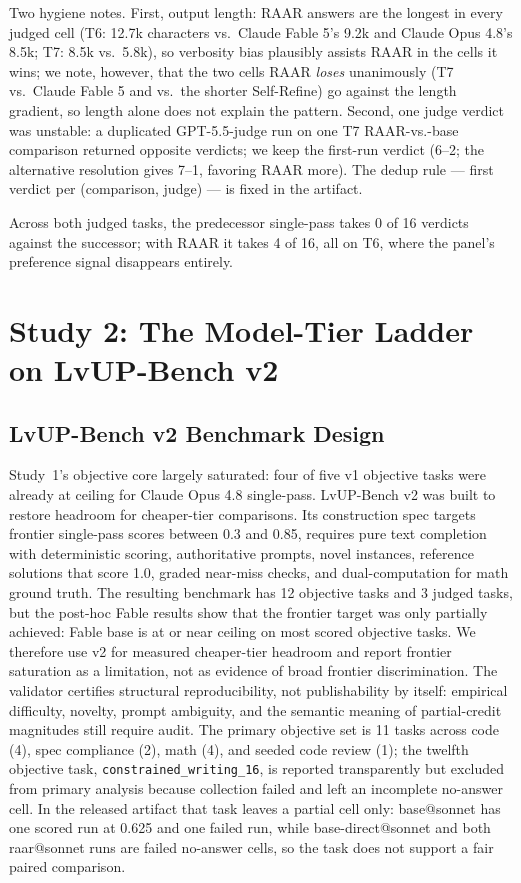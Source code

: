 \documentclass[journal]{IEEEtran}
\newcommand{\method}{RAAR}
\newcommand{\bench}{LvUP-Bench}
\newcommand{\opus}{Claude Opus 4.8}
\newcommand{\fable}{Claude Fable 5}
\begin{document}
Two hygiene notes. First, output length: \method{} answers are the longest
in every judged cell (T6: 12.7k characters vs.\ \fable{}'s 9.2k and
\opus{}'s 8.5k; T7: 8.5k vs.\ 5.8k), so verbosity bias \cite{zheng2023}
plausibly assists \method{} in the cells it wins; we note, however, that
the two cells \method{} \emph{loses} unanimously (T7 vs.\ \fable{} and
vs.\ the shorter Self-Refine) go against the length gradient, so length
alone does not explain the pattern. Second, one judge verdict was unstable:
a duplicated GPT-5.5-judge run on one T7 \method{}-vs.-base comparison returned
opposite verdicts; we keep the first-run verdict (6--2; the alternative
resolution gives 7--1, favoring \method{} more). The dedup rule ---
first verdict per (comparison, judge) --- is fixed in the artifact.

Across both judged tasks, the predecessor single-pass takes 0 of 16
verdicts against the successor; with \method{} it takes 4 of 16, all on
T6, where the panel's preference signal disappears entirely.

\section{Study 2: The Model-Tier Ladder on \bench{} v2}
\label{sec:study2}

\subsection{\bench{} v2 Benchmark Design}
Study~1's objective core largely saturated: four of five v1 objective tasks
were already at ceiling for \opus{} single-pass. \bench{} v2 was built to
restore headroom for cheaper-tier comparisons. Its construction spec targets
frontier single-pass scores between 0.3 and 0.85, requires pure text
completion with deterministic scoring, authoritative prompts, novel
instances, reference solutions that score 1.0, graded near-miss checks, and
dual-computation for math ground truth. The resulting benchmark has 12
objective tasks and 3 judged tasks, but the post-hoc Fable results show that
the frontier target was only partially achieved: Fable base is at or near
ceiling on most scored objective tasks. We therefore use v2 for measured
cheaper-tier headroom and report frontier saturation as a limitation, not as
evidence of broad frontier discrimination.
The validator certifies structural reproducibility, not publishability by
itself: empirical difficulty, novelty, prompt ambiguity, and the semantic
meaning of partial-credit magnitudes still require audit.
The primary objective set is 11 tasks across code (4), spec compliance (2),
math (4), and seeded code review (1); the twelfth objective task,
\texttt{constrained\_writing\_16}, is reported transparently but excluded
from primary analysis because collection failed and left an incomplete
no-answer cell. In the released artifact that task leaves a partial cell only:
base@sonnet has one scored run at 0.625 and one failed run, while
base-direct@sonnet and both raar@sonnet runs are failed no-answer cells, so
the task does not support a fair paired comparison.
\end{document}
